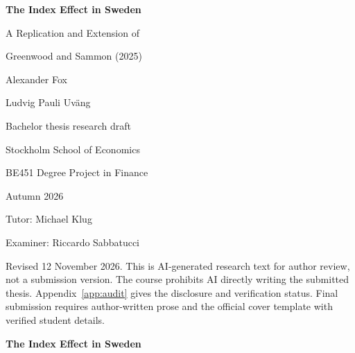 \documentclass[12pt,a4paper]{article}
\begin{document}
\begin{titlepage}
\centering
\vspace*{20mm}
{\LARGE\bfseries The Index Effect in Sweden\par}
\vspace{8mm}
{\large A Replication and Extension of\par Greenwood and Sammon (2025)\par}
\vspace{16mm}
{\large Alexander Fox\par Ludvig Pauli Uväng\par}
\vspace{12mm}
Bachelor thesis research draft\par
Stockholm School of Economics\par
BE451 Degree Project in Finance\par
Autumn 2026\par
\vspace{10mm}
Tutor: Michael Klug\par
Examiner: Riccardo Sabbatucci\par
\vfill
\begin{minipage}{.88\textwidth}\small
Revised 12 November 2026. This is AI-generated research text for author review, not a submission version. The course prohibits AI directly writing the submitted thesis. Appendix~\ref{app:audit} gives the disclosure and verification status. Final submission requires author-written prose and the official cover template with verified student details.
\end{minipage}
\end{titlepage}
\thispagestyle{plain}
\begin{center}\large\bfseries The Index Effect in Sweden\end{center}
\begin{abstract}
We ask whether the disappearing index effect documented by Greenwood and Sammon (2025) also appears in Sweden, and what kind of return remains. Around OMX Stockholm Benchmark changes from July 2007 through June 2026, additions earn 2.15\% over the later decade, with a 95\% interval of [1.01\%, 3.39\%]. The latest five-year estimate is less precise. Covered benchmark-linked funds buy 1.03\% of shares outstanding on the matched later sample, and trading becomes more concentrated immediately before implementation. The positive addition association survives separately reported return exclusions and exceeds a size-screened comparison after correcting its control timing. Its historical decline is concentrated after a common initial seven-day window, while announcement lead times shorten. On a fixed later cohort, cumulative returns remain positive through twenty trading days after implementation. In a selected share-class sample, both the affected and sister classes move substantially, with an imprecise relative difference. The evidence supports a remaining later-decade addition association and identifies its trading and timing counterparts. It does not isolate a causal price response to index-fund demand. Changing holdings coverage particularly limits historical multiplier comparisons.
\end{abstract}
\end{document}
